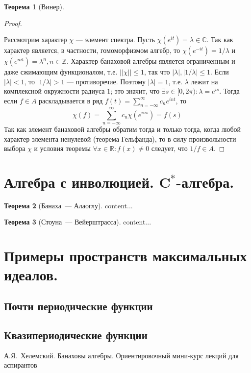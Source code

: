 \documentclass[12pt]{extarticle}
\theoremstyle{definition}
\newtheorem{theorem}{\indent Теорема}[section]
\begin{document}
\begin{theorem}[Винер]
\begin{proof}
\begin{enumerate}
		\end{enumerate}
		Рассмотрим характер $\chi$ — элемент спектра. Пусть $\chi(e^{it})=\lambda\in\mathbb{C}$. Так как характер является, в частности, гомоморфизмом алгебр, то $\chi(e^{-it})=1/\lambda$ и $\chi(e^{nit})=\lambda^n,n\in\mathbb{Z}$. Характер банаховой алгебры является ограниченным и даже сжимающим функционалом, т.е. $||\chi||\leq 1$, так что $|\lambda|, |1/\lambda|\leq 1$. Если $|\lambda|<1$, то $|1/\lambda|>1$ — противоречие. Поэтому $|\lambda|=1$, т.е. $\lambda$ лежит на комплексной окружности радиуса $1$; это значит, что $\exists s\in [0,2\pi):\lambda=e^{is}$. Тогда если $f\in A$ раскладывается в ряд $f(t)=\sum_{n=-\infty}^{\infty} c_n e^{int}$, то
		$$\chi(f)=\sum_{n=-\infty}^{\infty} c_n \chi (e^{ins})=f(s)$$
		Так как элемент банаховой алгебры обратим тогда и только тогда, когда любой характер элемента ненулевой (теорема Гельфанда), то в силу произвольности выбора $\chi$ и условия теоремы $\forall x\in\mathbb{R}: f(x)\neq 0$ следует, что $1/f\in A$.
    \end{proof}
        \end{theorem}

    \section{Алгебра с инволюцией. \(\symbf{C^*}\)-алгебра.}
        \begin{theorem}[Банаха~--- Алаоглу]\label{th:Alaoglu}
            content...
        \end{theorem}
        \begin{theorem}[Стоуна~--- Вейерштрасса]\label{th:StoneWrstrs}
            content...
        \end{theorem}

    \section[Примеры пространств максимальных идеалов]{Примеры пространств максимальных идеалов.}
        \subsection{Почти периодические функции}
        \subsection{Квазипериодические функции}
    \newpage
    \begin{thebibliography}{10}
        А.Я.~Хелемский. Банаховы алгебры. Ориентировочный мини-курс лекций для аспирантов
    \end{thebibliography}
\end{document}
